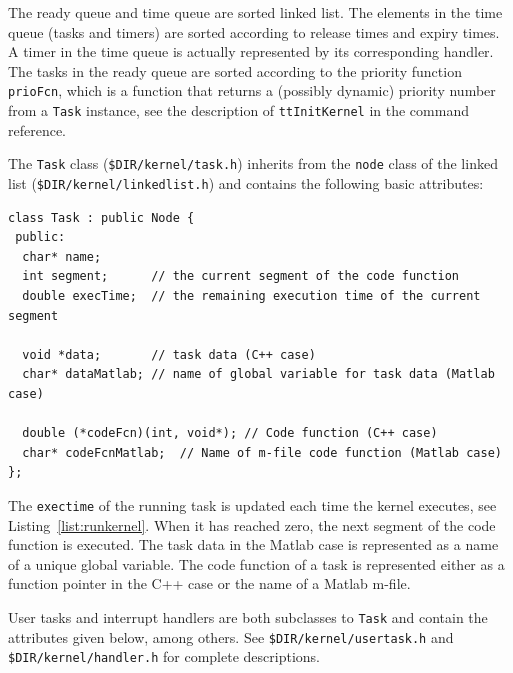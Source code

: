 \documentclass[final,twoside]{rapport}
\begin{document}
The ready queue and time queue are sorted linked list. The elements in
the time queue (tasks and timers) are sorted according to release
times and expiry times. A timer in the time queue is actually
represented by its corresponding handler. The tasks in the ready queue
are sorted according to the priority function \texttt{prioFcn}, which
is a function that returns a (possibly dynamic) priority number from a
\texttt{Task} instance, see the description of
\texttt{ttInitKernel} in the command reference.

The \texttt{Task} class (\texttt{\$DIR/kernel/task.h}) inherits from
the \texttt{node} class of the linked list
(\texttt{\$DIR/kernel/linkedlist.h}) and contains the following basic
attributes:

\begin{small}
\begin{verbatim}
class Task : public Node {
 public:
  char* name;
  int segment;      // the current segment of the code function
  double execTime;  // the remaining execution time of the current segment
  
  void *data;       // task data (C++ case)
  char* dataMatlab; // name of global variable for task data (Matlab case)

  double (*codeFcn)(int, void*); // Code function (C++ case)
  char* codeFcnMatlab;  // Name of m-file code function (Matlab case)
};
\end{verbatim}
\end{small}

The \texttt{exectime} of the running task is updated each time the
kernel executes, see Listing~\ref{list:runkernel}. When it has reached
zero, the next segment of the code function is executed. The task data
in the Matlab case is represented as a name of a unique global
variable.  The code function of a task is represented either as a
function pointer in the C++ case or the name of a Matlab m-file.

User tasks and interrupt handlers are both subclasses to \texttt{Task}
and contain the attributes given below, among others. See
\texttt{\$DIR/kernel/usertask.h} and \texttt{\$DIR/kernel/handler.h}
for complete descriptions.
\end{document}
